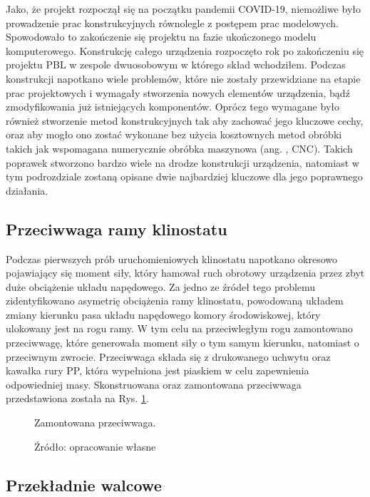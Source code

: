 Jako, że projekt rozpoczął się na początku pandemii COVID-19, niemożliwe było prowadzenie prac konstrukcyjnych równolegle z postępem prac modelowych. Spowodowało to zakończenie się projektu na fazie ukończonego modelu komputerowego. Konstrukcję całego urządzenia rozpoczęto rok po zakończeniu się projektu PBL w zespole dwuosobowym w którego skład wchodziłem. Podczas konstrukcji napotkano wiele problemów, które nie zostały przewidziane na etapie prac projektowych i wymagały stworzenia nowych elementów urządzenia, bądź zmodyfikowania już istniejących komponentów. Oprócz tego wymagane było również stworzenie metod konstrukcyjnych tak aby zachować jego kluczowe cechy, oraz aby mogło ono zostać wykonane bez użycia kosztownych metod obróbki takich jak wspomagana numerycznie obróbka maszynowa (ang. , CNC). Takich poprawek stworzono bardzo wiele na drodze konstrukcji urządzenia, natomiast w tym podrozdziale zostaną opisane dwie najbardziej kluczowe dla jego poprawnego działania.


\subsection{Przeciwwaga ramy klinostatu}

Podczas pierwszych prób uruchomieniowych klinostatu napotkano okresowo pojawiający się moment siły, który hamował ruch obrotowy urządzenia przez zbyt duże obciążenie układu napędowego. Za jedno ze źródeł tego problemu zidentyfikowano asymetrię obciążenia ramy klinostatu, powodowaną układem zmiany kierunku pasa układu napędowego komory środowiskowej, który ulokowany jest na rogu ramy. W tym celu na przeciwległym rogu zamontowano przeciwwagę, które generowała moment siły o tym samym kierunku, natomiast o przeciwnym zwrocie. Przeciwwaga składa się z drukowanego uchwytu oraz kawałka rury PP, która wypełniona jest piaskiem w celu zapewnienia odpowiedniej masy. Skonstruowana oraz zamontowana przeciwwaga przedstawiona została na Rys. \ref{fig:przeciwwaga}.

\begin{figure}[ht]
	\centering
	\setlength{\fboxsep}{0pt}
	\setlength{\fboxrule}{1pt}
	\caption{Zamontowana przeciwwaga.} 
	\caption*{Źródło: opracowanie własne}
	\label{fig:przeciwwaga}
\end{figure}

\subsection{Przekładnie walcowe}

